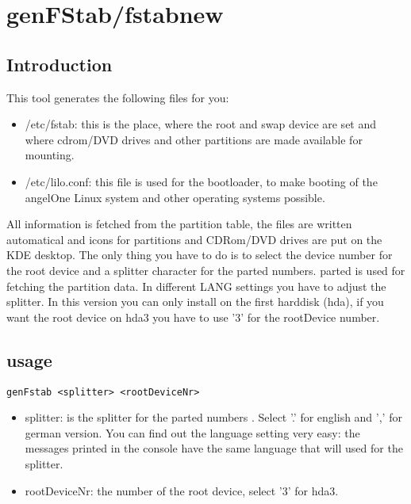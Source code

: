 \section{genFStab/fstabnew}
\subsection{Introduction}
This tool generates the following files for you:\\
\begin{itemize}
\item /etc/fstab: this is the place, where the root and swap device are set and where cdrom/DVD drives and other partitions are made available for mounting.
\item /etc/lilo.conf: this file is used for the bootloader, to make booting of the angelOne Linux system and other operating systems possible.
\end{itemize}
All information is fetched from the partition table, the files are written automatical and icons for partitions and CDRom/DVD drives are put on the KDE desktop. The only thing you have to do is to select the device number for the root device and a splitter character for the parted numbers. parted is used for fetching the partition data. In different LANG settings you have to adjust the splitter. In this version you can only install on the first harddisk (hda), if you want the root device on hda3 you have to use '3' for the rootDevice number.
\subsection{usage}
\begin{verbatim}
genFstab <splitter> <rootDeviceNr>
\end{verbatim} 
\begin{itemize}
\item splitter: is the splitter for the parted numbers . Select '.' for english and ',' for german version. You can find out the language setting very easy: the messages printed in the console have the same language that will used for the splitter.
\item rootDeviceNr: the number of the root device, select '3' for hda3.
\end{itemize} 
